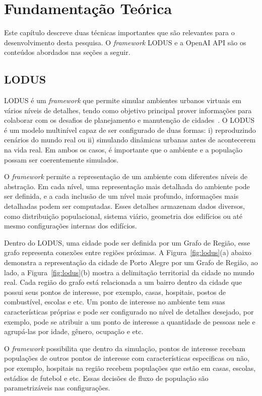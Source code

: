 \chapter{Fundamentação Teórica} \label{cpt:contexto}
Este capítulo descreve duas técnicas importantes que são relevantes para o desenvolvimento desta pesquisa. O \textit{framework} LODUS e a OpenAI API são os conteúdos abordados nas seções a seguir.

\section{\label{sec:back_lodus}LODUS}
LODUS é um \textit{framework} que permite simular ambientes urbanos virtuais em vários níveis de detalhes, tendo como objetivo principal prover informações para colaborar com os desafios de planejamento e manutenção de cidades~\cite{9239083}. O LODUS é um modelo multinível capaz de ser configurado de duas formas: i) reproduzindo cenários do mundo real ou ii) simulando dinâmicas urbanas antes de acontecerem na vida real. Em ambos os casos, é importante que o ambiente e a população possam ser coerentemente simulados.

O \textit{framework} permite a representação de um ambiente com diferentes níveis de abstração. Em cada nível, uma representação mais detalhada do ambiente pode ser definida, e a cada inclusão de um nível mais profundo, informações mais detalhadas podem ser computadas. Esses detalhes armazenam dados diversos, como distribuição populacional, sistema viário, geometria dos edifícios ou até mesmo configurações internas dos edifícios.

Dentro do LODUS, uma cidade pode ser definida por um Grafo de Região, esse grafo representa conexões entre regiões próximas. A Figura~\ref{fig:lodus}(a) abaixo demonstra a representação da cidade de Porto Alegre por um Grafo de Região, ao lado, a Figura~\ref{fig:lodus}(b) mostra a delimitação territorial da cidade no mundo real. Cada região do grafo está relacionada a um bairro dentro da cidade que possui seus pontos de interesse, por exemplo, casas, hospitais, postos de combustível, escolas e etc. Um ponto de interesse no ambiente tem suas características próprias e pode ser configurado no nível de detalhes desejado, por exemplo, pode se atribuir a um ponto de interesse a quantidade de pessoas nele e agrupá-las por idade, gênero, ocupação e etc. 

O \textit{framework} possibilita que dentro da simulação, pontos de interesse recebam populações de outros pontos de interesse com características especificas ou não, por exemplo, hospitais na região recebem populações que estão em casas, escolas, estádios de futebol e etc. Essas decisões de fluxo de população são parametrizáveis nas configurações.

